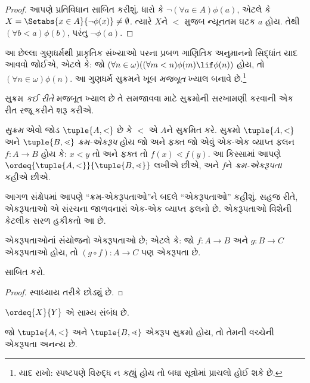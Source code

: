 \begin{proof}
આપણે પ્રતિવિધાન સાબિત કરીશું. ધારો કે $\lnot(\forall a \in
A)\phi(a)$, એટલે કે $X = \Setabs{x \in A}{\lnot\phi(x)} \neq
\emptyset$. ત્યારે $X$ને $<$ મુજબ ન્યૂનતમ ઘટક $a$
હોય. તેથી $(\forall
b < a)\phi(b)$, પરંતુ $\lnot \phi(a)$.
\end{proof}\noindent આ છેલ્લા ગુણધર્મથી પ્રાકૃતિક સંખ્યાઓ પરના
પ્રબળ ગાણિતિક અનુમાનનો સિદ્ધાંત યાદ આવવો જોઈએ, એટલે કે:
જો $(\forall n \in \omega)((\forall m < n)\phi(m)
\lif \phi(n))$ હોય, તો $(\forall n \in \omega)\phi(n)$.
આ ગુણધર્મ સુક્રમને ખૂબ \emph{મજબૂત} ખ્યાલ બનાવે છે.\footnote{
યાદ રાખો: સ્પષ્ટપણે વિરુદ્ધ ન કહ્યું હોય તો બધા સૂત્રોમાં
પ્રાચલો હોઈ શકે છે.}
\endgroup

\begingroup
\makeatletter{}\makeatother

\label{guunit:OLP-0551}


સુક્રમ \emph{કઈ રીતે} મજબૂત ખ્યાલ છે તે સમજાવવા માટે
સુક્રમોની સરખામણી કરવાની એક રીત રજૂ કરીને શરૂ કરીએ.

\begin{defn}
\emph{સુક્રમ} એવો જોડ $\tuple{A, <}$ છે કે $<$ એ $A$ને
સુક્રમિત કરે. સુક્રમો $\tuple{A, <}$ અને $\tuple{B,
\lessdot}$ \emph{ક્રમ-એકરૂપ} હોય જો અને ફક્ત જો એવું
એક-એક વ્યાપ્ત ફલન $f \colon A \to B$ હોય કે:
$x < y$ તો અને ફક્ત તો $f(x) \lessdot  f(y)$.
આ કિસ્સામાં આપણે
$\ordeq{\tuple{A, <}}{\tuple{B, \lessdot}}$ લખીએ છીએ,
અને $f$ને \emph{ક્રમ-એકરૂપતા} કહીએ છીએ.
\end{defn}
\noindent
આગળ સંક્ષેપમાં આપણે “ક્રમ-એકરૂપતાઓ”ને બદલે “એકરૂપતાઓ”
કહીશું. સહજ રીતે, એકરૂપતાઓ એ સંરચના જાળવનારાં
એક-એક વ્યાપ્ત ફલનો છે. એકરૂપતાઓ વિશેની કેટલીક સરળ હકીકતો આ છે.

\begin{lem}
એકરૂપતાઓનાં સંયોજનો એકરૂપતાઓ છે; એટલે કે:
જો $f \colon A
\to B$ અને $g \colon B \to C$ એકરૂપતાઓ હોય,
તો $(g \circ f)
\colon A \to C$ પણ એકરૂપતા છે.
\end{lem}
\begin{prob}
	 સાબિત કરો.
\end{prob}
\begin{proof}
સ્વાધ્યાય તરીકે છોડ્યું છે.
\end{proof}
\begin{cor}
	$\ordeq{X}{Y}$ એ સામ્ય સંબંધ છે.
\end{cor}
\begin{prop}
જો $\tuple{A, <}$ અને $\tuple{B, \lessdot}$ એકરૂપ સુક્રમો હોય,
તો તેમની વચ્ચેની એકરૂપતા અનન્ય છે.
\end{prop}

